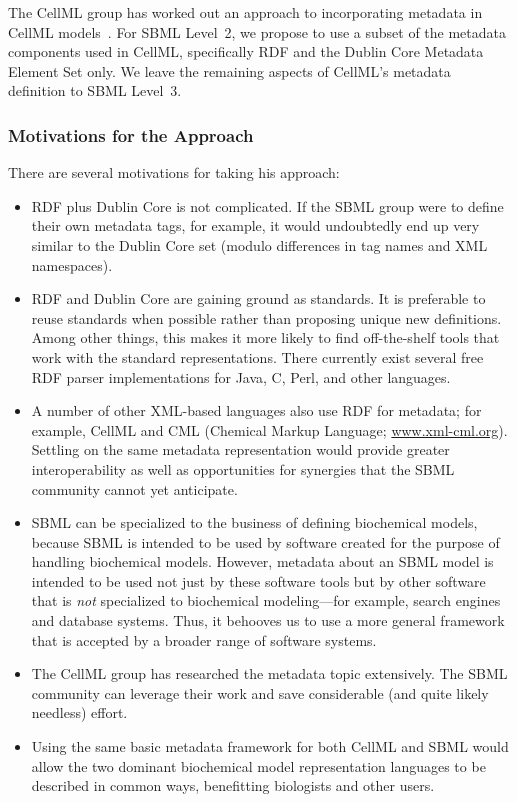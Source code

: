 \documentclass[10pt]{cekarticle}
\begin{document}
The CellML group has worked out an approach to incorporating metadata in
CellML models~\citep{cuellar:2002}.  For SBML Level~2, we propose to use a
subset of the metadata components used in CellML, specifically RDF and the
Dublin Core Metadata Element Set only.  We leave the remaining aspects of
CellML's metadata definition to SBML Level~3.

\subsubsection{Motivations for the Approach}

There are several motivations for taking his approach:
\begin{itemize}

\item RDF plus Dublin Core is not complicated.  If the SBML group were to
  define their own metadata tags, for example, it would undoubtedly end up
  very similar to the Dublin Core set (modulo differences in tag names and
  XML namespaces).
  
\item RDF and Dublin Core are gaining ground as standards.  It is
  preferable to reuse standards when possible rather than proposing unique
  new definitions.  Among other things, this makes it more likely to find
  off-the-shelf tools that work with the standard representations.  There
  currently exist several free RDF parser implementations for Java, C,
  Perl, and other languages.
  
\item A number of other XML-based languages also use RDF for metadata; for
  example, CellML and CML (Chemical Markup Language;
  \url{www.xml-cml.org}).  Settling on the same metadata representation
  would provide greater interoperability as well as opportunities for
  synergies that the SBML community cannot yet anticipate.
 
\item SBML can be specialized to the business of defining biochemical
  models, because SBML is intended to be used by software created for the
  purpose of handling biochemical models.  However, metadata about an SBML
  model is intended to be used not just by these software tools but by
  other software that is \emph{not} specialized to biochemical
  modeling---for example, search engines and database systems.  Thus, it
  behooves us to use a more general framework that is accepted by a broader
  range of software systems.

\item The CellML group has researched the metadata topic extensively.  The
  SBML community can leverage their work and save considerable (and quite
  likely needless) effort.
  
\item Using the same basic metadata framework for both CellML and SBML
  would allow the two dominant biochemical model representation languages
  to be described in common ways, benefitting biologists and other users.

\end{itemize}
\end{document}
